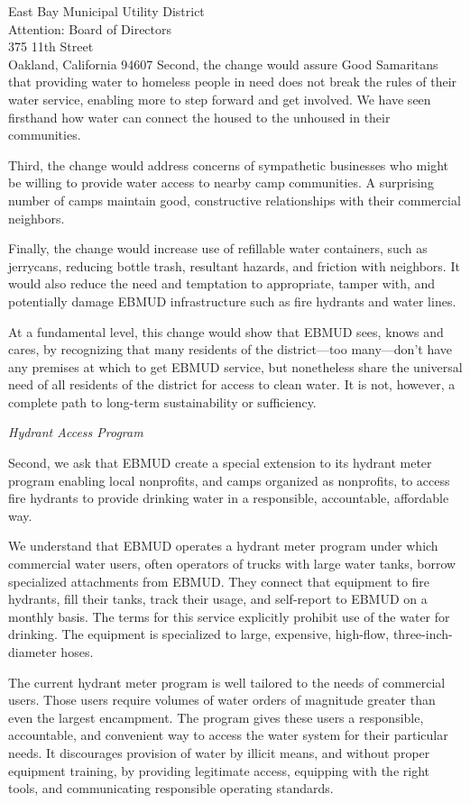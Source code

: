 \documentclass[letterpaper]{letter}
\begin{document}
\begin{letter}{%
    East Bay Municipal Utility District\\
    Attention: Board of Directors\\
    375 11th Street\\
    Oakland, California 94607}
    Second, the change would assure Good Samaritans that providing water to homeless people in need does not break the rules of their water service, enabling more to step forward and get involved. We have seen firsthand how water can connect the housed to the unhoused in their communities.

    Third, the change would address concerns of sympathetic businesses who might be willing to provide water access to nearby camp communities. A surprising number of camps maintain good, constructive relationships with their commercial neighbors.

    Finally, the change would increase use of refillable water containers, such as jerrycans, reducing bottle trash, resultant hazards, and friction with neighbors. It would also reduce the need and temptation to appropriate, tamper with, and potentially damage EBMUD infrastructure such as fire hydrants and water lines.

    At a fundamental level, this change would show that EBMUD sees, knows and cares, by recognizing that many residents of the district—too many—don’t have any premises at which to get EBMUD service, but nonetheless share the universal need of all residents of the district for access to clean water. It is not, however, a complete path to long-term sustainability or sufficiency.

    \stopbreaks
    \emph{Hydrant Access Program}

    Second, we ask that EBMUD create a special extension to its hydrant meter program enabling local nonprofits, and camps organized as nonprofits, to access fire hydrants to provide drinking water in a responsible, accountable, affordable way.
    \startbreaks

    We understand that EBMUD operates a hydrant meter program under which commercial water users, often operators of trucks with large water tanks, borrow specialized attachments from EBMUD. They connect that equipment to fire hydrants, fill their tanks, track their usage, and self-report to EBMUD on a monthly basis. The terms for this service explicitly prohibit use of the water for drinking. The equipment is specialized to large, expensive, high-flow, three-inch-diameter hoses.

    The current hydrant meter program is well tailored to the needs of commercial users. Those users require volumes of water orders of magnitude greater than even the largest encampment. The program gives these users a responsible, accountable, and convenient way to access the water system for their particular needs. It discourages provision of water by illicit means, and without proper equipment training, by providing legitimate access, equipping with the right tools, and communicating responsible operating standards.


\end{letter}
\end{document}
